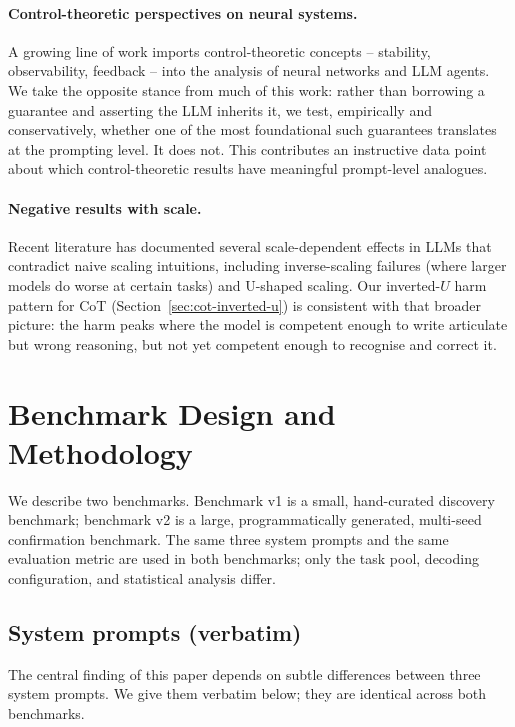 \documentclass[11pt]{article}
\begin{document}
\paragraph{Control-theoretic perspectives on neural systems.}
A growing line of work imports control-theoretic concepts --
stability, observability, feedback -- into the analysis of neural
networks and LLM agents.  We take the opposite stance from much of
this work:  rather than borrowing a guarantee and asserting the
LLM inherits it, we test, empirically and conservatively, whether
one of the most foundational such guarantees translates at the
prompting level.  It does not.  This contributes an instructive
data point about which control-theoretic results have meaningful
prompt-level analogues.

\paragraph{Negative results with scale.}
Recent literature has documented several scale-dependent effects
in LLMs that contradict naive scaling intuitions, including
inverse-scaling failures (where larger models do worse at certain
tasks) and U-shaped scaling.  Our inverted-$U$ harm pattern for
CoT (Section~\ref{sec:cot-inverted-u}) is consistent with that
broader picture: the harm peaks where the model is competent
enough to write articulate but wrong reasoning, but not yet
competent enough to recognise and correct it.

\section{Benchmark Design and Methodology}
\label{sec:method}

We describe two benchmarks.  Benchmark v1 is a small,
hand-curated discovery benchmark; benchmark v2 is a large,
programmatically generated, multi-seed confirmation benchmark.
The same three system prompts and the same evaluation metric are
used in both benchmarks; only the task pool, decoding
configuration, and statistical analysis differ.

\subsection{System prompts (verbatim)}
\label{sec:prompts}

The central finding of this paper depends on subtle differences
between three system prompts.  We give them verbatim below; they
are identical across both benchmarks.
\end{document}
